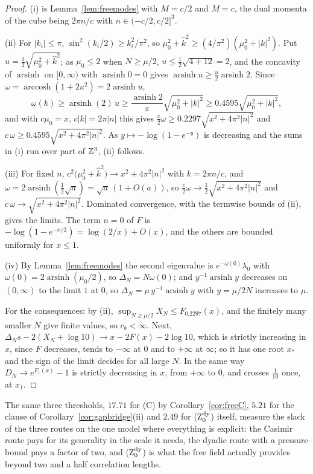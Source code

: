 \begin{proof}
(i) is Lemma~\ref{lem:freemodes} with $M=c/2$ and $M=c$, the dual momenta of
the cube being $2\pi n/c$ with $n\in(-c/2,c/2]^3$.

(ii) For $|k_i|\le\pi$, $\sin^2(k_i/2)\ge k_i^2/\pi^2$, so $\mu_0^2+\hat k^2\ge
(4/\pi^2)(\mu_0^2+|k|^2)$. Put $u=\frac12\sqrt{\mu_0^2+\hat k^2}$; as $\mu_0\le
2$ when $N\ge\mu/2$, $u\le\frac12\sqrt{4+12}=2$, and the concavity of
$\operatorname{arsinh}$ on $[0,\infty)$ with $\operatorname{arsinh}0=0$ gives
$\operatorname{arsinh}u\ge\frac u2\operatorname{arsinh}2$. Since $\omega=
\operatorname{arccosh}(1+2u^2)=2\operatorname{arsinh}u$,
\[
\omega(k)\ge\operatorname{arsinh}(2)\,u\ge\frac{\operatorname{arsinh}2}{\pi}
\sqrt{\mu_0^2+|k|^2}\ge0.4595\sqrt{\mu_0^2+|k|^2},
\]
and with $c\mu_0=x$, $c|k|=2\pi|n|$ this gives $\frac c2\omega\ge0.2297\sqrt{
x^2+4\pi^2|n|^2}$ and $c\,\omega\ge0.4595\sqrt{x^2+4\pi^2|n|^2}$. As $y\mapsto
-\log(1-e^{-y})$ is decreasing and the sums in (i) run over part of $\mathbb{Z}^3$,
(ii) follows.

(iii) For fixed $n$, $c^2\bigl(\mu_0^2+\hat k^2\bigr)\to x^2+4\pi^2|n|^2$ with
$k=2\pi n/c$, and $\omega=2\operatorname{arsinh}(\frac12\sqrt a)=\sqrt a\,(1+
O(a))$, so $\frac c2\omega\to\frac12\sqrt{x^2+4\pi^2|n|^2}$ and $c\,\omega\to
\sqrt{x^2+4\pi^2|n|^2}$. Dominated convergence, with the termwise bounds of
(ii), gives the limits. The term $n=0$ of $F$ is $-\log(1-e^{-x/2})=\log(2/x)+
O(x)$, and the others are bounded uniformly for $x\le1$.

(iv) By Lemma~\ref{lem:freemodes} the second eigenvalue is $e^{-\omega(0)}
\lambda_0$ with $\omega(0)=2\operatorname{arsinh}(\mu_0/2)$, so $\Delta_N=N
\omega(0)$; and $y^{-1}\operatorname{arsinh}y$ decreases on $(0,\infty)$ to
the limit $1$ at $0$, so $\Delta_N=\mu\,y^{-1}\operatorname{arsinh}y$ with $y=
\mu/2N$ increases to $\mu$.

For the consequences: by (ii), $\sup_{N\ge\mu/2}X_N\le F_{0.2297}(x)$, and the
finitely many smaller $N$ give finite values, so $c_b<\infty$. Next, $\Delta_N
s-2(X_N+\log10)\to x-2F(x)-2\log10$, which is strictly increasing in $x$, since
$F$ decreases, tends to $-\infty$ at $0$ and to $+\infty$ at $\infty$; so it
has one root $x_*$ and the sign of the limit decides for all large $N$. In
the same way $D_N\to e^{F_1(x)}-1$ is strictly decreasing in $x$, from
$+\infty$ to $0$, and crosses $\frac1{10}$ once, at $x_1$.
\end{proof}

The same three thresholds, $17.71$ for (C) by Corollary~\ref{cor:freeC},
$5.21$ for the clause of Corollary~\ref{cor:gapbridge}(ii) and $2.49$ for
(Z$_0^{\rm dy}$) itself, measure the slack of the three routes on the one
model where everything is explicit: the Casimir route pays for its
generality in the scale it needs, the dyadic route with a pressure bound
pays a factor of two, and (Z$_0^{\rm dy}$) is what the free field actually
provides beyond two and a half correlation lengths.

